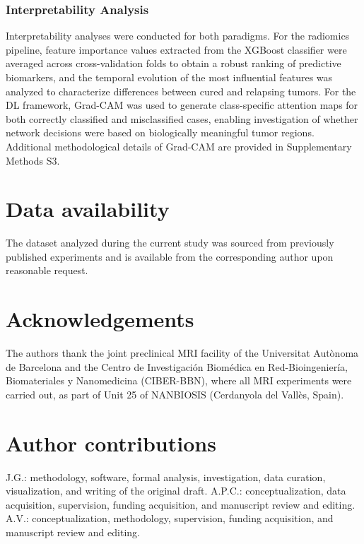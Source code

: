 \documentclass{article}
\begin{document}
\subsubsection{Interpretability Analysis}

Interpretability analyses were conducted for both paradigms. For the radiomics pipeline, feature importance values extracted from the XGBoost classifier were averaged across cross-validation folds to obtain a robust ranking of predictive biomarkers, and the temporal evolution of the most influential features was analyzed to characterize differences between cured and relapsing tumors. For the DL framework, Grad-CAM \cite{selvaraju2017gradcam} was used to generate class-specific attention maps for both correctly classified and misclassified cases, enabling investigation of whether network decisions were based on biologically meaningful tumor regions. Additional methodological details of Grad-CAM are provided in Supplementary Methods S3.

\section*{Data availability}
The dataset analyzed during the current study was sourced from previously published experiments and is available from the corresponding author upon reasonable request.

\section*{Acknowledgements}
The authors thank the joint preclinical MRI facility of the Universitat Autònoma de Barcelona and the Centro de Investigación Biomédica en Red-Bioingeniería, Biomateriales y Nanomedicina (CIBER-BBN), where all MRI experiments were carried out, as part of Unit 25 of NANBIOSIS (Cerdanyola del Vallès, Spain).

\section*{Author contributions}
J.G.: methodology, software, formal analysis, investigation, data curation, visualization, and writing of the original draft.\newline
A.P.C.: conceptualization, data acquisition, supervision, funding acquisition, and manuscript review and editing.\newline
A.V.: conceptualization, methodology, supervision, funding acquisition, and manuscript review and editing.
\end{document}
